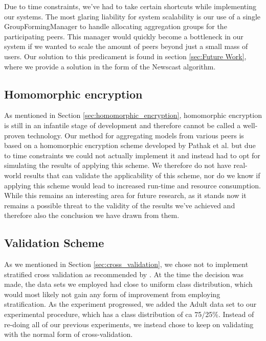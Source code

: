 Due to time constraints, we've had to take certain shortcuts while implementing our systems. The most glaring liability for system scalability is our use of a single GroupFormingManager to handle allocating aggregation groups for the participating peers. This manager would quickly become a bottleneck in our system if we wanted to scale the amount of peers beyond just a small mass of users. Our solution to this predicament is found in section \ref{sec:Future Work}, where we provide a solution in the form of the Newscast algorithm. 

\subsection{Homomorphic encryption}
As mentioned in Section \ref{sec:homomorphic_encryption}, homomorphic encryption is still in an infantile stage of development and therefore cannot be called a well-proven technology. Our method for aggregating models from various peers is based on a homomorphic encryption scheme developed by Pathak et al. but due to time constraints we could not actually implement it and instead had to opt for simulating the results of applying this scheme. We therefore do not have real-world results that can validate the applicability of this scheme, nor do we know if applying this scheme would lead to increased run-time and resource consumption. While this remains an interesting area for future research, as it stands now it remains a possible threat to the validity of the results we've achieved and therefore also the conclusion we have drawn from them.  

\subsection{Validation Scheme}
As we mentioned in Section \ref{sec:cross_validation}, we chose not to implement stratified cross validation as recommended by \cite{kohavi1995crossvalidation}. At the time the decision was made, the data sets we employed had close to uniform class distribution, which would most likely not gain any form of improvement from employing stratification. As the experiment progressed, we added the Adult data set to our experimental procedure, which has a class distribution of ca 75/25\%. Instead of re-doing all of our previous experiments, we instead chose to keep on validating with the normal form of cross-validation. 

